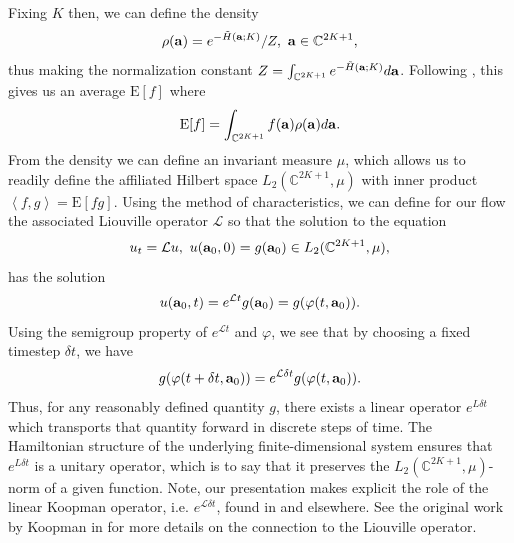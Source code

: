\documentclass[aps,prl,preprint,groupedaddress]{revtex4-1}
\begin{document}
Fixing $K$ then, we can define the density 
\[
\rho({\bf a}) = e^{-\tilde{H}({\bf a};K)}/Z, ~ {\bf a} \in \mathbb{C}^{2K+1},
\]
thus making the normalization constant $Z = \int_{\mathbb{C}^{2K+1}} e^{-\tilde{H}({\bf a};K)} d{\bf a}$.  Following \cite{chorin}, this gives us an average $\mbox{E}[f]$ where 
\[
\mbox{E}[f] = \int_{\mathbb{C}^{2K+1}} f({\bf a})\rho({\bf a})d{\bf a}.
\]
From the density we can define an invariant measure $\mu$, which allows us to readily define the affiliated Hilbert space $L_{2}(\mathbb{C}^{2K+1},\mu)$ with inner product $\left<f,g\right> = \mbox{E}[fg]$. Using the method of characteristics, we can define for our flow the associated Liouville operator $\mathcal{L}$ so that the solution to the equation
\[
u_{t} = \mathcal{L}u, ~ u({\bf a}_{0},0) = g({\bf a}_{0}) \in L_{2}(\mathbb{C}^{2K+1},\mu),
\]
has the solution
\[
u({\bf a}_{0},t) = e^{\mathcal{L}t}g({\bf a}_{0}) = g(\varphi(t,{\bf a}_{0})).  
\]
Using the semigroup property of $e^{\mathcal{L}t}$ and $\varphi$, we see that by choosing a fixed timestep $\delta t$, we have 
\[
g(\varphi(t+\delta t,{\bf a}_{0}))= e^{\mathcal{L}\delta t} g(\varphi(t,{\bf a}_{0})).
\]
Thus, for any reasonably defined quantity $g$, there exists a linear operator $e^{L\delta t}$ which transports that quantity forward in discrete steps of time.  The Hamiltonian structure of the underlying finite-dimensional system ensures that $e^{L\delta t}$ is a unitary operator, which is to say that it preserves the $L_{2}(\mathbb{C}^{2K+1},\mu)$-norm of a given function.  Note, our presentation makes explicit the role of the linear Koopman operator, i.e. $e^{\mathcal{L}\delta t}$, found in \cite{kutz} and elsewhere.  See the original work by Koopman in \cite{koopman} for more details on the connection to the Liouville operator.  
\end{document}
